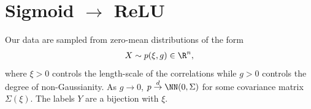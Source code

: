 \documentclass{article}
\begin{document}
















\newpage
\section{Sigmoid $\to$ ReLU}
Our data are sampled from zero-mean distributions of the form
\begin{align}
  X \sim p(\xi, g) \in \R^n,
\end{align}
where $\xi > 0$ controls the length-scale of the correlations while $g > 0$ controls the degree of non-Gaussianity.
As $g \to 0$, $p \overset{d}{\to} \NN(0, \Sigma)$ for some covariance matrix $\Sigma(\xi)$.
The labels $Y$ are a bijection with $\xi$.
\end{document}
